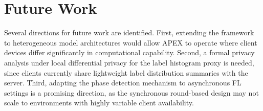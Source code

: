 \documentclass[journal]{IEEEtran}
\begin{document}
\section{Future Work}

Several directions for future work are identified. First, extending the framework to heterogeneous model architectures would allow APEX to operate where client devices differ significantly in computational capability. Second, a formal privacy analysis under local differential privacy for the label histogram proxy is needed, since clients currently share lightweight label distribution summaries with the server. Third, adapting the phase detection mechanism to asynchronous FL settings is a promising direction, as the synchronous round-based design may not scale to environments with highly variable client availability.



\end{document}

